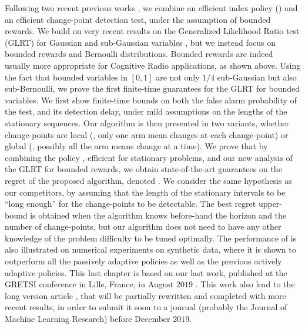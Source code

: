 Following two recent previous works \cite{LiuLeeShroff17,CaoZhenKvetonXie18}, we combine an efficient index policy (\klUCB) and an efficient change-point detection test, under the assumption of bounded rewards.
We build on very recent results on the Generalized Likelihood Ratio test (GLRT) for Gaussian and sub-Gaussian variables \cite{Maillard2018GLR}, but we instead focus on bounded rewards and Bernoulli distributions.
Bounded rewards are indeed usually more appropriate for Cognitive Radio applications, as shown above.
Using the fact that bounded variables in $[0,1]$ are not only $1/4$ sub-Gaussian but also sub-Bernoulli, we prove the first finite-time guarantees for the GLRT for bounded variables.
We first show finite-time bounds on both the false alarm probability of the test, and its detection delay, under mild assumptions on the lengths of the stationary sequences.
Our algorithm is then presented in two variants, whether change-points are local (\ie, only one arm mean changes at each change-point) or global (\ie, possibly all the arm means change at a time).
%
We prove that by combining the policy \klUCB, efficient for stationary problems, and our new analysis of the GLRT for bounded rewards, we obtain state-of-the-art guarantees on the regret of the proposed algorithm, denoted \GLRklUCB.
We consider the same hypothesis as our competitors, by assuming that the length of the stationary intervals to be ``long enough'' for the change-points to be detectable.
The best regret upper-bound is obtained when the algorithm knows before-hand the horizon and the number of change-points, but our algorithm does not need to have any other knowledge of the problem difficulty to be tuned optimally.
%
The performance of \GLRklUCB{} is also illustrated on numerical experiments on synthetic data, where it is shown to outperform all the passively adaptive policies as well as the previous actively adaptive policies.
%
This last chapter is based on our last work, published at the GRETSI conference in Lille, France, in August $2019$ \cite{Besson2019Gretsi}.
This work also lead to the long version article \cite{Besson2019GLRT}, that will be partially rewritten and completed with more recent results, in order to submit it soon to a journal (probably the Journal of Machine Learning Research) before December $2019$.


